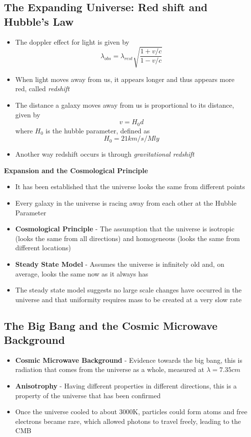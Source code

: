 \subsection{The Expanding Universe: Red shift and Hubble's Law}
\begin{itemize}
    \item The doppler effect for light is given by \[\lambda_{obs}=\lambda_{rest}\sqrt{\frac{1+v/c}{1-v/c}}\]
    \item When light moves away from us, it appears longer and thus appears more red, called \emph{redshift}
    \item The distance a galaxy moves away from us is proportional to its distance, given by \[v=H_0d\] where \(H_0\) is the hubble parameter, defined as \[H_0=21km/s/Mly\]
    \item Another way redshift occurs is through \emph{gravitational redshift}
\end{itemize}

\textbf{Expansion and the Cosmological Principle}
\begin{itemize}
    \item It has been established that the universe looks the same from different points
    \item Every galaxy in the universe is racing away from each other at the Hubble Parameter
    \item \textbf{Cosmological Principle} - The assumption that the universe is isotropic (looks the same from all directions) and homogeneous (looks the same from different locations)
    \item \textbf{Steady State Model} - Assumes the universe is infinitely old and, on average, looks the same now as it always has
    \item The steady state model suggests no large scale changes have occurred in the universe and that uniformity requires mass to be created at a very slow rate
\end{itemize}

\subsection{The Big Bang and the Cosmic Microwave Background}
\begin{itemize}
    \item \textbf{Cosmic Microwave Background} - Evidence towards the big bang, this is radiation that comes from the universe as a whole, measured at \(\lambda = 7.35cm\)
    \item \textbf{Anisotrophy} - Having different properties in different directions, this is a property of the universe that has been confirmed
    \item Once the universe cooled to about 3000K, particles could form atoms and free electrons became rare, which allowed photons to travel freely, leading to the CMB
\end{itemize}

